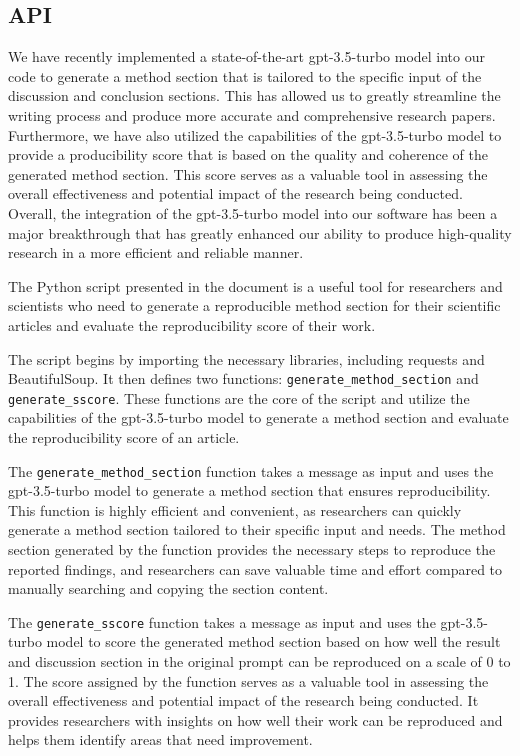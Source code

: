 \documentclass[12pt, a4paper, twocolumn]{article}
\begin{document}
		\subsection{API}
		We have recently implemented a state-of-the-art gpt-3.5-turbo model into our code to generate a method section that is tailored to the specific input of the discussion and conclusion sections. This has allowed us to greatly streamline the writing process and produce more accurate and comprehensive research papers. Furthermore, we have also utilized the capabilities of the gpt-3.5-turbo model to provide a producibility score that is based on the quality and coherence of the generated method section. This score serves as a valuable tool in assessing the overall effectiveness and potential impact of the research being conducted. Overall, the integration of the gpt-3.5-turbo model into our software has been a major breakthrough that has greatly enhanced our ability to produce high-quality research in a more efficient and reliable manner.

The Python script presented in the document is a useful tool for researchers and scientists who need to generate a reproducible method section for their scientific articles and evaluate the reproducibility score of their work.

The script begins by importing the necessary libraries, including requests and BeautifulSoup. It then defines two functions: \texttt{generate\_method\_section} and \texttt{generate\_sscore}. These functions are the core of the script and utilize the capabilities of the gpt-3.5-turbo model to generate a method section and evaluate the reproducibility score of an article.

The \texttt{generate\_method\_section} function takes a message as input and uses the gpt-3.5-turbo model to generate a method section that ensures reproducibility. This function is highly efficient and convenient, as researchers can quickly generate a method section tailored to their specific input and needs. The method section generated by the function provides the necessary steps to reproduce the reported findings, and researchers can save valuable time and effort compared to manually searching and copying the section content.

The \texttt{generate\_sscore} function takes a message as input and uses the gpt-3.5-turbo model to score the generated method section based on how well the result and discussion section in the original prompt can be reproduced on a scale of 0 to 1. The score assigned by the function serves as a valuable tool in assessing the overall effectiveness and potential impact of the research being conducted. It provides researchers with insights on how well their work can be reproduced and helps them identify areas that need improvement.
\end{document}

